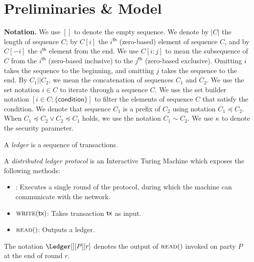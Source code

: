 \section{Preliminaries \& Model}\label{sec:prelims}

\noindent
\textbf{Notation.} 
We use $[]$ to denote the empty sequence.
We denote by $|C|$ the length of sequence $C$;
by $C[i]$ the $i^{\textsf{th}}$ (zero-based) element of
sequence $C$, and by $C[-i]$ the $i^{\textsf{th}}$ element
from the end. We use $C[i{:}j]$ to mean the subsequence
of $C$ from the $i^{\textsf{th}}$ (zero-based inclusive)
to the $j^{\textsf{th}}$ (zero-based exclusive).
Omitting $i$ takes the sequence to the beginning,
and omitting $j$ takes the sequence to the end.
By $C_1 || C_2$, we mean the concatenation
of sequences $C_1$ and $C_2$.
We use the set notation $i \in C$ to iterate
through a sequence $C$.\atnote{[?]}
We use the set builder notation $[i \in C: \{\textsf{condition}\}]$
to filter the elements of sequence $C$ that satisfy the condition. \atnote{[?]}
We denote that sequence $C_1$ is a prefix of $C_2$
using notation $C_1 \preccurlyeq C_2$.
When $C_1 \preccurlyeq C_2 \lor C_2 \preccurlyeq C_1$ holds,
we use the notation $C_1 \sim C_2$.
We use $\kappa$ to denote the security parameter.

\begin{definition}[Ledger]
  A \emph{ledger} is a sequence of transactions.
\end{definition}

\begin{definition}
  A \emph{distributed ledger protocol} is an
  Interactive Turing Machine which exposes the following
  methods:
  \begin{itemize}
    \item \execute: Executes a single round of the protocol, during
      which the machine can communicate with the network.
    \item $\textsc{write}(\textsf{tx})$: Takes transaction $\textsf{tx}$ as input.
    \item $\textsc{read}()$: Outputs a ledger.
  \end{itemize}
\end{definition}

The notation
$\Ledger[][P][r]$ denotes the output of $\textsc{read}()$
invoked on party $P$ at the end of round $r$.

